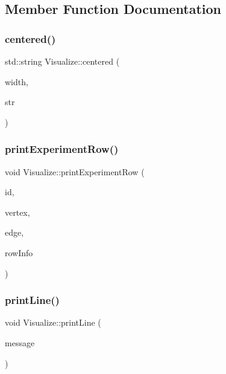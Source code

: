 \subsection{Member Function Documentation}
\mbox{\label{class_visualize_a9d34d81d684587b8b2b8bf70031f1670}} 
\subsubsection{\texorpdfstring{centered()}{centered()}}
{\footnotesize\ttfamily std\+::string Visualize\+::centered (\begin{DoxyParamCaption}\item[{int}]{width,  }\item[{const std\+::string \&}]{str }\end{DoxyParamCaption})}

\mbox{\label{class_visualize_a52a0dfaf625bd3ac294a00e3161094cf}} 
\subsubsection{\texorpdfstring{print\+Experiment\+Row()}{printExperimentRow()}}
{\footnotesize\ttfamily void Visualize\+::print\+Experiment\+Row (\begin{DoxyParamCaption}\item[{int}]{id,  }\item[{int}]{vertex,  }\item[{int}]{edge,  }\item[{std\+::vector$<$ \hyperlink{struct_utility_structs_1_1_storage_items}{Utility\+Structs\+::\+Storage\+Items} $>$}]{row\+Info }\end{DoxyParamCaption})}

\mbox{\label{class_visualize_abce6cd538dc0715b21851e0bf0377d85}} 
\subsubsection{\texorpdfstring{print\+Line()}{printLine()}}
{\footnotesize\ttfamily void Visualize\+::print\+Line (\begin{DoxyParamCaption}\item[{std\+::string}]{message }\end{DoxyParamCaption})}

